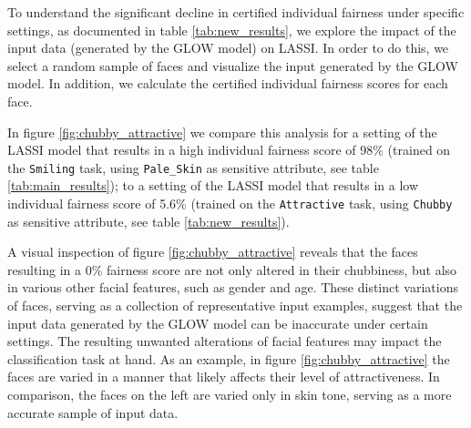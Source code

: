To understand the significant decline in certified individual fairness under specific settings, as documented in table \ref{tab:new_results}, we explore the impact of the input data (generated by the GLOW model) on LASSI. In order to do this, we select a random sample of faces and visualize the input generated by the GLOW model. In addition, we calculate the certified individual fairness scores for each face. \newline

In figure \ref{fig:chubby_attractive} we compare this analysis for a setting of the LASSI model that results in a high individual fairness score of 98\% (trained on the \texttt{Smiling} task, using \texttt{Pale\_Skin} as sensitive attribute, see table \ref{tab:main_results}); to a setting of the LASSI model that results in a low individual fairness score of 5.6\% (trained on the \texttt{Attractive} task, using \texttt{Chubby} as sensitive attribute, see table \ref{tab:new_results}). \newline


A visual inspection of figure \ref{fig:chubby_attractive} reveals that the faces resulting in a 0\% fairness score are not only altered in their chubbiness, but also in various other facial features, such as gender and age. These distinct variations of faces, serving as a collection of representative input examples, suggest that the input data generated by the GLOW model can be inaccurate under certain settings. The resulting unwanted alterations of facial features may impact the classification task at hand. As an example, in figure \ref{fig:chubby_attractive} the faces are varied in a manner that likely affects their level of attractiveness. In comparison, the faces on the left are varied only in skin tone, serving as a more accurate sample of input data.


